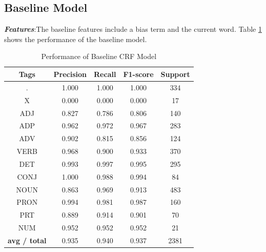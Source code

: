 \documentclass[12pt]{article}
\begin{document}
\subsection{Baseline Model}

\textbf{\textit{Features}}:The baseline features include a bias term and the current word. Table \ref{tab:table2} shows the performance of the baseline model.

\begin{table}[h!]
\begin{center}
    \caption{Performance of Baseline CRF Model}
    \label{tab:table2}
\begin{tabular}{ c c c c c}
 \textbf{Tags}& \textbf{Precision} & \textbf{Recall} & \textbf{F1-score} & \textbf{Support} \\ 
 \hline
          .  &     1.000   &   1.000  &    1.000   &     334\\
          X   &    0.000   &   0.000  &    0.000   &      17\\
        ADJ   &    0.827   &   0.786   &   0.806   &     140\\
        ADP  &     0.962   &   0.972   &   0.967    &    283\\
        ADV   &    0.902  &    0.815  &    0.856    &    124\\
       VERB  &     0.968  &    0.900  &    0.933   &     370\\
        DET  &     0.993  &    0.997  &    0.995   &     295\\
       CONJ   &    1.000  &    0.988   &   0.994   &      84\\
       NOUN   &    0.863  &    0.969   &   0.913   &    483\\
       PRON  &     0.994  &    0.981   &   0.987   &     160\\
        PRT  &     0.889  &    0.914   &   0.901   &      70\\
        NUM  &     0.952  &    0.952   &   0.952    &     21\\
\hline
\textbf{avg / total}    &    0.935   &   0.940    &  0.937     &  2381

\end{tabular}
\end{center}
\end{table}
\end{document}
